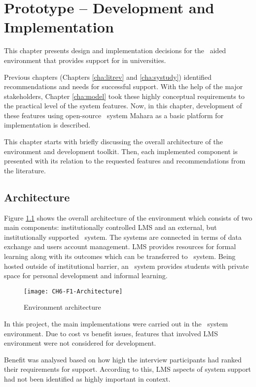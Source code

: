\chapter{Prototype -- Development and Implementation\label{cha:prototype}}
This chapter presents design and implementation decisions for the \ep~aided
environment that provides support for \LLLs in universities.

Previous chapters (Chapters \ref{cha:litrev} and \ref{cha:systudy}) identified
recommendations and needs for successful \LLLs support. With the help of the
major stakeholders, Chapter \ref{cha:model} took these highly conceptual
requirements to the practical level of the system features. Now, in this
chapter, development of these features using open-source \ep~system Mahara as a
basic platform for implementation is described.

This chapter starts with briefly discussing the overall architecture of the
environment and development toolkit. Then, each implemented component is
presented with its relation to the requested features and \LLLs recommendations
from the literature.

\section{Architecture}

Figure \ref{fig:arch} shows the overall architecture of the environment which
consists of two main components: institutionally controlled LMS and an external,
but institutionally supported \ep~system. The systems are connected in terms of
data exchange and users account management. LMS provides resources for formal
learning along with its outcomes which can be transferred to \ep~system. Being
hosted outside of institutional barrier, an \ep~system provides students with
private space for personal development and informal learning.

\begin{figure}[htp]
\centering
\texttt{[image: CH6-F1-Architecture]}
\caption{Environment architecture}
\label{fig:arch}
\end{figure}

In this project, the main implementations were carried out in the \ep~system
environment. Due to cost vs benefit issues, features that involved LMS
environment were not considered for development. 

Benefit was analysed based on how high the interview participants had ranked
their requirements for \LLLs support. According to this, LMS aspects of system
support had not been identified as highly important in \LLLs context. 

